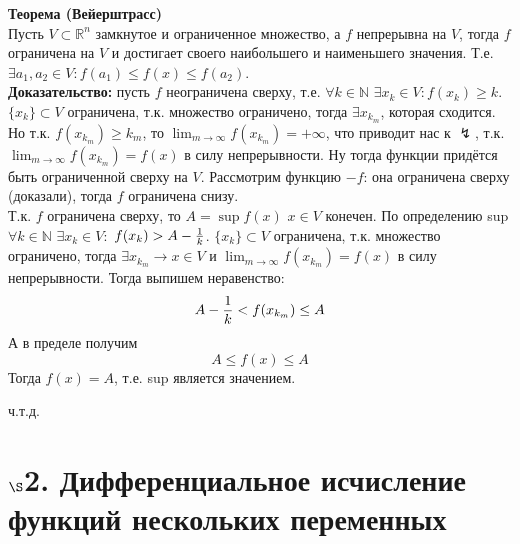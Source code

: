 \documentclass[book, 11pt]{report}
\begin{document}
        \par{\textbf{Теорема (Вейерштрасс)}\\
        Пусть $V\subset\mathbb{R}^n$ замкнутое и ограниченное множество, а $f$ непрерывна на $V$, тогда $f$ ограничена на $V$ и достигает своего наибольшего и наименьшего значения. Т.е. $\exists a_1,a_2\in V: f(a_1)\leq f(x)\leq f(a_2)$.\\
        \textbf{Доказательство: }пусть $f$ неограничена сверху, т.е. $\forall k\in\mathbb{N}$ $\exists x_k\in V:f(x_k)\geq k$. $\{x_k\}\subset V$ ограничена, т.к. множество ограничено, тогда $\exists x_{k_m}$, которая сходится. Но т.к. $f(x_{k_m})\geq k_m$, то $\displaystyle\lim_{m\to\infty}f(x_{k_m})=+\infty$, что приводит нас к $\lightning$, т.к. $\displaystyle\lim_{m\to\infty}f(x_{k_m})=f(x)$ в силу непрерывности. Ну тогда функции придётся быть ограниченной сверху на $V$. Рассмотрим функцию $-f$: она ограничена сверху (доказали), тогда $f$ ограничена снизу.\\
        Т.к. $f$ ограничена сверху, то $A=\sup f(x)$ $x\in V$ конечен. По определению sup $\forall k\in\mathbb{N}$ $\exists x_k\in V:$ $f(x_k)>A-{1\over k}$. $\{x_k\}\subset V$ ограничена, т.к. множество ограничено, тогда $\exists x_{k_m}\to x\in V$ и $\displaystyle\lim_{m\to\infty}f(x_{k_m})=f(x)$ в силу непрерывности. Тогда выпишем неравенство:
        \begin{equation*}
            A-{1\over k}<f(x_{k_m})\leq A
        \end{equation*}
        А в пределе получим
        \begin{equation*}
            A\leq f(x)\leq A
        \end{equation*}
        Тогда $f(x)=A$, т.е. sup является значением.
        }
        \par{{\raggedleft ч.т.д.\par}}
        \newpage
        \section*{$\S$2. Дифференциальное исчисление функций нескольких переменных}
\end{document}
